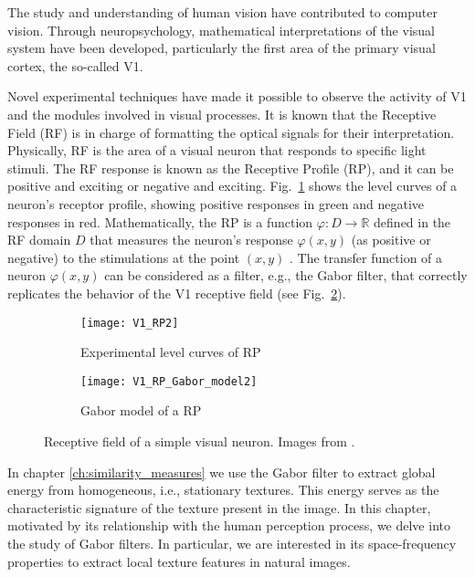 The study and understanding of human vision have contributed to computer vision. Through neuropsychology, mathematical interpretations of the visual system have been developed, particularly the first area of the primary visual cortex, the so-called V1.

Novel experimental techniques \citep{DeAngelis.Ohzawa.ea:TN:1995} have made it possible to observe the activity of V1 and the modules involved in visual processes. It is known that the Receptive Field (RF) is in charge of formatting the optical signals for their interpretation. Physically, RF is the area of a visual neuron that responds to specific light stimuli. The RF response is known as the Receptive Profile (RP), and it can be positive and exciting or negative and exciting. Fig.\ \ref{fig:V1_RP} shows the level curves of a neuron's receptor profile, showing positive responses in green and negative responses in red. 
Mathematically, the RP is a function $\varphi:  D \rightarrow \mathbb{R}$ defined in the RF domain $D$ that measures the neuron's response $\varphi(x,y)$ (as positive or negative) to the stimulations at the point $(x,y)$ \citep{Petitot:Neurogeometrie:2008}.
The transfer function of a neuron $\varphi(x,y)$ can be considered as a filter, e.g., the Gabor filter, that correctly replicates the behavior of the V1 receptive field (see Fig.\ \ref{fig:V1_RP_Gabor}).

\begin{figure}[!ht] 
	\centering
	\begin{subfigure}[b]{0.4\textwidth}
		\centering
		\texttt{[image: V1\_RP2]}
		\caption{Experimental level curves of RP}	
		\label{fig:V1_RP}
	\end{subfigure}
	\qquad %
	\begin{subfigure}[b]{0.4\textwidth}
		\centering
		\texttt{[image: V1\_RP\_Gabor\_model2]}
		\caption{Gabor model of a RP }	
		\label{fig:V1_RP_Gabor}
	\end{subfigure}

  \caption{Receptive field of a simple visual neuron. Images from \citep{Petitot:Neurogeometrie:2008}.}
  \label{fig:simple_neuron_receptive_profil}
\end{figure}

In chapter \ref{ch:similarity_measures} we use the Gabor filter to extract global energy from homogeneous, i.e., stationary textures. This energy serves as the characteristic signature of the texture present in the image. In this chapter, motivated by its relationship with the human perception process, we delve into the study of Gabor filters. In particular, we are interested in its space-frequency properties to extract local texture features in natural images.

